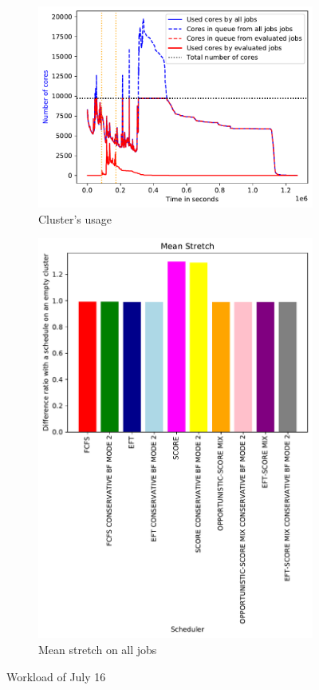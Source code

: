 \documentclass[a4paper]{article}
\begin{document}
\begin{figure}[H]\centering
\begin{subfigure}[b]{0.4\linewidth}\centering\includegraphics[width=1\linewidth]{MBSS/plot/2022-07-16->2022-07-16_V10000_Fcfs_Used_nodes_450_128_32_256_4_1024.pdf}\caption{Cluster's usage}\end{subfigure}
\begin{subfigure}[b]{0.4\linewidth}\centering\includegraphics[width=0.9\linewidth]{MBSS/plot/Results_FCFS_Score_Backfill_2022-07-16->2022-07-16_V10000_Mean_Stretch_450_128_32_256_4_1024.pdf}\caption{Mean stretch on all jobs}\end{subfigure}
\caption{Workload of July 16}\end{figure}
\end{document}
